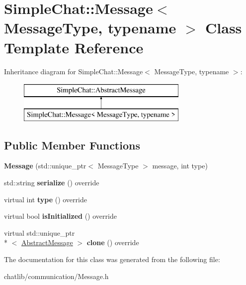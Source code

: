 \hypertarget{classSimpleChat_1_1Message}{\section{Simple\-Chat\-:\-:Message$<$ Message\-Type, typename $>$ Class Template Reference}
\label{classSimpleChat_1_1Message}
}
Inheritance diagram for Simple\-Chat\-:\-:Message$<$ Message\-Type, typename $>$\-:\begin{figure}[H]
\begin{center}
\leavevmode
\includegraphics[height=2.000000cm]{classSimpleChat_1_1Message}
\end{center}
\end{figure}
\subsection*{Public Member Functions}
\begin{DoxyCompactItemize}
\item 
\hypertarget{classSimpleChat_1_1Message_a5e589f4b47b48c6c2a57395e7da5a1da}{{\bfseries Message} (std\-::unique\-\_\-ptr$<$ Message\-Type $>$ message, int type)}\label{classSimpleChat_1_1Message_a5e589f4b47b48c6c2a57395e7da5a1da}

\item 
\hypertarget{classSimpleChat_1_1Message_a10d69aeec672948394683cc3b3943551}{std\-::string {\bfseries serialize} () override}\label{classSimpleChat_1_1Message_a10d69aeec672948394683cc3b3943551}

\item 
\hypertarget{classSimpleChat_1_1Message_a26ee452950cb78108a2d3f4d2c7be436}{virtual int {\bfseries type} () override}\label{classSimpleChat_1_1Message_a26ee452950cb78108a2d3f4d2c7be436}

\item 
\hypertarget{classSimpleChat_1_1Message_abcff4eb636679bc459d40e312f296f52}{virtual bool {\bfseries is\-Initialized} () override}\label{classSimpleChat_1_1Message_abcff4eb636679bc459d40e312f296f52}

\item 
\hypertarget{classSimpleChat_1_1Message_a360640255aa3288041c747840dae975e}{virtual std\-::unique\-\_\-ptr\\*
$<$ \hyperlink{classSimpleChat_1_1AbstractMessage}{Abstract\-Message} $>$ {\bfseries clone} () override}\label{classSimpleChat_1_1Message_a360640255aa3288041c747840dae975e}

\end{DoxyCompactItemize}


The documentation for this class was generated from the following file\-:\begin{DoxyCompactItemize}
\item 
chatlib/communication/Message.\-h\end{DoxyCompactItemize}
